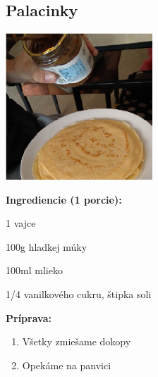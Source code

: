 \setcounter{step}{0}

\subsection{ Palacinky }

\begin{ingredient}
  
      \includegraphics[height=5.5cm]{images/palacinky}
  
  \def\portions{  }
  \textbf{ {\normalsize Ingrediencie (1 porcie):} }

  \begin{main}
      \item 1 vajce
      \item 100g hladkej múky
      \item 100ml mlieko
      \item 1/4 vanilkového cukru, štipka soli
  \end{main}
  
\end{ingredient}
\begin{recipe}
\textbf{ {\normalsize Príprava:} }
\begin{enumerate}

  \item{Všetky zmiešame dokopy}
  \item{Opekáme na panvici}

\end{enumerate}
\end{recipe}

\begin{notes}
  
\end{notes}	
\clearpage
